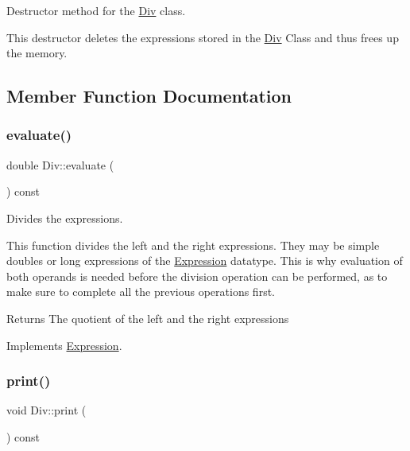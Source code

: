 Destructor method for the \hyperlink{class_div}{Div} class. 

This destructor deletes the expressions stored in the \hyperlink{class_div}{Div} Class and thus frees up the memory. 

\subsection{Member Function Documentation}
\mbox{\label{class_div_a5b96e19e7cffdb205a9e56377be3652e}} 
\subsubsection{\texorpdfstring{evaluate()}{evaluate()}}
{\footnotesize\ttfamily double Div\+::evaluate (\begin{DoxyParamCaption}{ }\end{DoxyParamCaption}) const\hspace{0.3cm}{\ttfamily [virtual]}}



Divides the expressions. 

This function divides the left and the right expressions. They may be simple doubles or long expressions of the \hyperlink{class_expression}{Expression} datatype. This is why evaluation of both operands is needed before the division operation can be performed, as to make sure to complete all the previous operations first.

\begin{DoxyReturn}{Returns}
The quotient of the left and the right expressions 
\end{DoxyReturn}


Implements \hyperlink{class_expression_a7437adfabeaeb0500d62d10c43a1f853}{Expression}.

\mbox{\label{class_div_acbcc6e3d0f3ccb5e74de28de8499cbbf}} 
\subsubsection{\texorpdfstring{print()}{print()}}
{\footnotesize\ttfamily void Div\+::print (\begin{DoxyParamCaption}{ }\end{DoxyParamCaption}) const\hspace{0.3cm}{\ttfamily [virtual]}}



